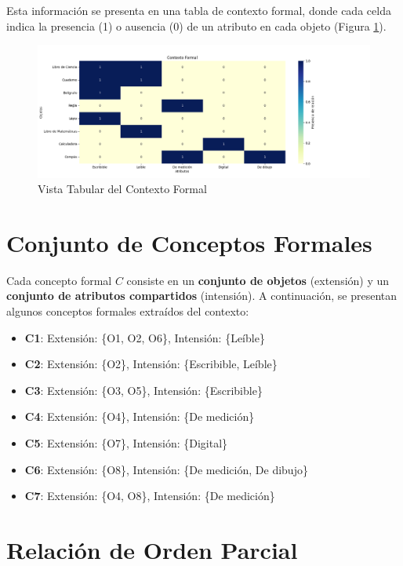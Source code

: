 Esta información se presenta en una tabla de contexto formal, donde cada celda indica la presencia (1) o ausencia (0) de un atributo en cada objeto (Figura \ref{fig:tabular_view}).

\begin{figure}[H]
  \centering
  \includegraphics[width=\textwidth]{Figures/1. Content/tabular_view.png}
  \caption{Vista Tabular del Contexto Formal}
  \label{fig:tabular_view}
\end{figure}

\section{Conjunto de Conceptos Formales}

Cada concepto formal \( C \) consiste en un \textbf{conjunto de objetos} (extensión) y un \textbf{conjunto de atributos compartidos} (intensión). A continuación, se presentan algunos conceptos formales extraídos del contexto:

\begin{itemize}
    \item \textbf{C1}: Extensión: \{O1, O2, O6\}, Intensión: \{Leíble\}
    \item \textbf{C2}: Extensión: \{O2\}, Intensión: \{Escribible, Leíble\}
    \item \textbf{C3}: Extensión: \{O3, O5\}, Intensión: \{Escribible\}
    \item \textbf{C4}: Extensión: \{O4\}, Intensión: \{De medición\}
    \item \textbf{C5}: Extensión: \{O7\}, Intensión: \{Digital\}
    \item \textbf{C6}: Extensión: \{O8\}, Intensión: \{De medición, De dibujo\}
    \item \textbf{C7}: Extensión: \{O4, O8\}, Intensión: \{De medición\}
\end{itemize}

\section{Relación de Orden Parcial}

